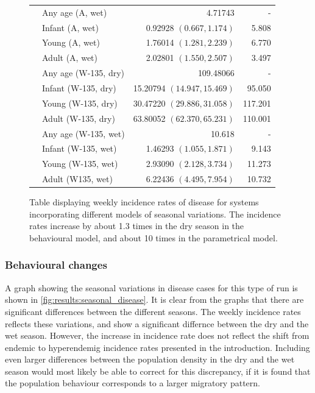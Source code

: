\documentclass[10pt,a4paper]{article}
\begin{document}
\begin{figure}
\begin{tabular}{l|l|r|r}
								& Any age (A, wet)					& 4.71743							& -								\\
								& Infant (A, wet)					& 0.92928 $(0.667, 1.174)$			& 5.808							\\
								& Young (A, wet)					& 1.76014 $(1.281, 2.239)$			& 6.770							\\
								& Adult (A, wet)					& 2.02801 $(1.550, 2.507)$			& 3.497							\\
								& Any age (W-135, dry)				& 109.48066							& -								\\
								& Infant (W-135, dry)				& 15.20794 $(14.947, 15.469)$		& 95.050						\\
								& Young (W-135, dry)				& 30.47220 $(29.886, 31.058)$		& 117.201						\\
								& Adult (W-135, dry)				& 63.80052 $(62.370, 65.231)$		& 110.001						\\
								& Any age (W-135, wet)				& 10.618							& -								\\
								& Infant (W-135, wet)				& 1.46293 $(1.055, 1.871)$			& 9.143							\\
								& Young (W-135, wet)				& 2.93090 $(2.128, 3.734)$			& 11.273						\\
								& Adult (W135, wet)					& 6.22436 $(4.495, 7.954)$			& 10.732						\\ \hline
	\end{tabular}
	\caption{Table displaying weekly incidence rates of disease for systems incorporating different models of seasonal variations. The incidence rates increase by about 1.3 times in the dry season in the behavioural model, and about 10 times in the parametrical model.} \label{table:results:incidence_seasonal}
\end{figure}

\subsubsection{Behavioural changes}

A graph showing the seasonal variations in disease cases for this type of run is shown in \cref{fig:results:seasonal_disease}. It is clear from the graphs that there are significant differences between the different seasons. The weekly incidence rates reflects these variations, and show a significant differnce between the dry and the wet season. However, the increase in incidence rate does not reflect the shift from endemic to hyperendemig incidence rates presented in the introduction. Including even larger differences between the population density in the dry and the wet season would most likely be able to correct for this discrepancy, if it is found that the population behaviour corresponds to a larger migratory pattern.
\end{document}
